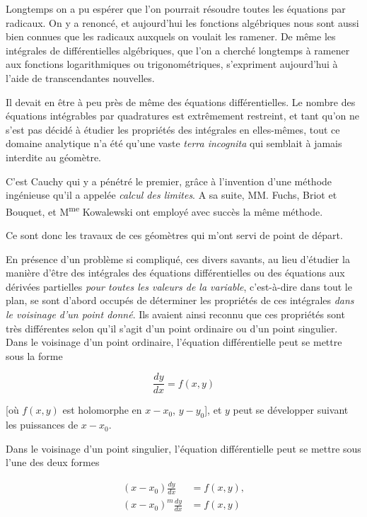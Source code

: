\documentclass[11pt]{article}
\begin{document}
Longtemps on a pu espérer que l’on pourrait résoudre toutes les équations par radicaux. On y a renoncé, et aujourd’hui les fonctions algébriques nous sont aussi bien connues que les radicaux auxquels on voulait les ramener. De même les intégrales de différentielles algébriques, que l’on a cherché longtemps à ramener aux fonctions logarithmiques ou trigonométriques, s’expriment aujourd’hui à l’aide de transcendantes nouvelles.

Il devait en être à peu près de même des équations différentielles. Le nombre des équations intégrables par quadratures est extrêmement restreint, et tant qu’on ne s’est pas décidé à étudier les propriétés des intégrales en elles-mêmes, tout ce domaine analytique n’a été qu’une vaste \emph{terra incognita} qui semblait à jamais interdite au géomètre.

C’est Cauchy qui y a pénétré le premier, grâce à l’invention d’une méthode ingénieuse qu’il a appelée \emph{calcul des limites}. A sa suite, MM. Fuchs, Briot et Bouquet, et M\textsuperscript{me} Kowalewski ont employé avec succès la même méthode.

Ce sont donc les travaux de ces géomètres qui m’ont servi de point de départ.

En présence d’un problème si compliqué, ces divers savants, au lieu d’étudier la manière d’être des intégrales des équations différentielles ou des équations aux dérivées partielles \emph{pour toutes les valeurs de la variable}, c’est-à-dire dans tout le plan, se sont d’abord occupés de déterminer les propriétés de ces intégrales \emph{dans le voisinage d’un point donné}. Ils avaient ainsi reconnu que ces propriétés sont très différentes selon qu’il s’agit d’un point ordinaire ou d’un point singulier. Dans le voisinage d’un point ordinaire, l’équation différentielle peut se mettre sous la forme

\begin{equation}
\frac{dy}{dx}=f(x,y)
\end{equation}

[où $f(x,y)$ est holomorphe en $x-x_0$, $y-y_0$], et $y$ peut se développer suivant les puissances de $x-x_0$.

Dans le voisinage d’un point singulier, l’équation différentielle peut se mettre sous l’une des deux formes

\begin{align}
(x-x_0)\frac{dy}{dx}&=f(x,y),\\
(x-x_0)^m\frac{dy}{dx}&=f(x,y)
\end{align}
\end{document}
